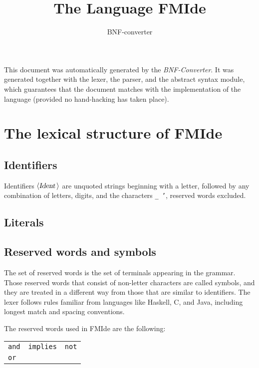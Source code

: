 \documentclass[a4paper,11pt]{article}
\author{BNF-converter}
\title{The Language FMIde}
\begin{document}
\maketitle

\newcommand{\emptyP}{\mbox{$\epsilon$}}
\newcommand{\terminal}[1]{\mbox{{\texttt {#1}}}}
\newcommand{\nonterminal}[1]{\mbox{$\langle \mbox{{\sl #1 }} \! \rangle$}}
\newcommand{\arrow}{\mbox{::=}}
\newcommand{\delimit}{\mbox{$|$}}
\newcommand{\reserved}[1]{\mbox{{\texttt {#1}}}}
\newcommand{\literal}[1]{\mbox{{\texttt {#1}}}}
\newcommand{\symb}[1]{\mbox{{\texttt {#1}}}}

This document was automatically generated by the {\em BNF-Converter}. It was generated together with the lexer, the parser, and the abstract syntax module, which guarantees that the document matches with the implementation of the language (provided no hand-hacking has taken place).

\section*{The lexical structure of FMIde}
\subsection*{Identifiers}
Identifiers \nonterminal{Ident} are unquoted strings beginning with a letter,
followed by any combination of letters, digits, and the characters {\tt \_ '},
reserved words excluded.


\subsection*{Literals}


\subsection*{Reserved words and symbols}
The set of reserved words is the set of terminals appearing in the grammar. Those reserved words that consist of non-letter characters are called symbols, and they are treated in a different way from those that are similar to identifiers. The lexer follows rules familiar from languages like Haskell, C, and Java, including longest match and spacing conventions.

The reserved words used in FMIde are the following: \\

\begin{tabular}{lll}
{\reserved{and}} &{\reserved{implies}} &{\reserved{not}} \\
{\reserved{or}} & & \\
\end{tabular}\\
\end{document}
